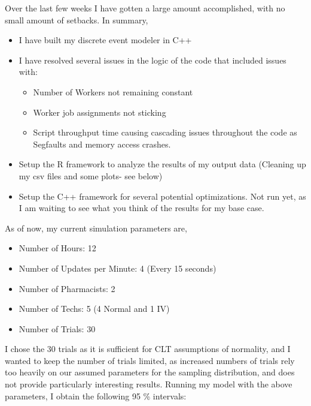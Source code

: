 \documentclass[letterpaper,10pt]{article}
\begin{document}
Over the last few weeks I have gotten a large amount accomplished, with no small amount of setbacks. In summary,
\begin{itemize}
\item I have built my discrete event modeler in C++
\item I have resolved several issues in the logic of the code that included issues with:
\begin{itemize}
\item Number of Workers not remaining constant
\item Worker job assignments not sticking
\item Script throughput time causing cascading issues throughout the code as Segfaults and memory access crashes.
\end{itemize}
\item Setup the R framework to analyze the results of my output data (Cleaning up my csv files and some plots- see below)
\item Setup the C++ framework for several potential optimizations. Not run yet, as I am waiting to see what you think of the results for my base case.
\end{itemize}
As of now, my current simulation parameters are,
\begin{itemize}
\item Number of Hours: 12
\item Number of Updates per Minute: 4 (Every 15 seconds)
\item Number of Pharmacists: 2
\item Number of Techs: 5 (4 Normal and 1 IV)
\item Number of Trials: 30
\end{itemize}
I chose the 30 trials as it is sufficient for CLT assumptions of normality, and I wanted to keep the number of trials limited, as increased numbers of trials rely too heavily on our assumed parameters for the sampling distribution, and does not provide particularly interesting results. Running my model with the above parameters, I obtain the following 95 \% intervals:
\end{document}
